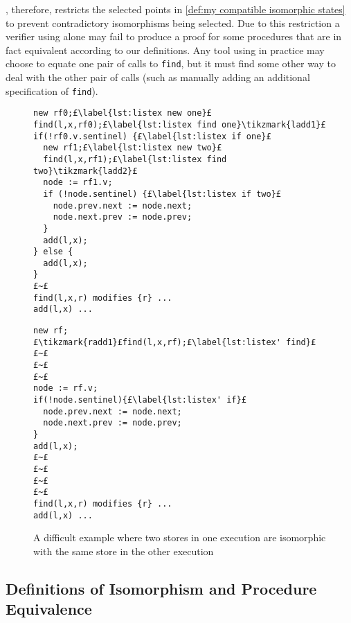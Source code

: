 \documentclass[runningheads,a4paper]{llncs}
\newcommand{\tikzmark}[1]{\tikz[overlay,remember picture] \node (#1) {};}
\begin{document}
\metho{}, therefore, restricts the selected points in \cref{def:my compatible isomorphic states} to prevent contradictory isomorphisms being selected. Due to this restriction a verifier using \metho{} alone may fail to produce a proof for some procedures that are in fact equivalent according to our definitions. Any tool using \metho{} in practice may choose to equate one pair of calls to \texttt{find}, but it must find some other way to deal with the other pair of calls (such as manually adding an additional specification of \texttt{find}). 

\begin{figure}[htbp]
\noindent\begin{minipage}{.48\textwidth}
\begin{lstlisting}[style=bl,name=copyex,firstnumber=auto]
new rf0;£\label{lst:listex new one}£
find(l,x,rf0);£\label{lst:listex find one}\tikzmark{ladd1}£
if(!rf0.v.sentinel) {£\label{lst:listex if one}£
  new rf1;£\label{lst:listex new two}£
  find(l,x,rf1);£\label{lst:listex find two}\tikzmark{ladd2}£
  node := rf1.v;
  if (!node.sentinel) {£\label{lst:listex if two}£
    node.prev.next := node.next;
    node.next.prev := node.prev;
  }
  add(l,x);
} else {
  add(l,x);
}
£~£
find(l,x,r) modifies {r} ...
add(l,x) ...
\end{lstlisting}
\end{minipage}%
\begin{minipage}{.48\textwidth}
\begin{lstlisting}[style=bl,name=copyex,firstnumber=auto]
new rf;
£\tikzmark{radd1}£find(l,x,rf);£\label{lst:listex' find}£
£~£
£~£
£~£
node := rf.v;
if(!node.sentinel){£\label{lst:listex' if}£
  node.prev.next := node.next;
  node.next.prev := node.prev;
}
add(l,x);
£~£
£~£
£~£
£~£
find(l,x,r) modifies {r} ...
add(l,x) ...
\end{lstlisting}
\end{minipage}%
\caption{A difficult example where two stores in one execution are isomorphic with the same store in the other execution\label{fig:listex}}%
%
\end{figure}

\subsection{Definitions of Isomorphism and Procedure Equivalence}
\end{document}
